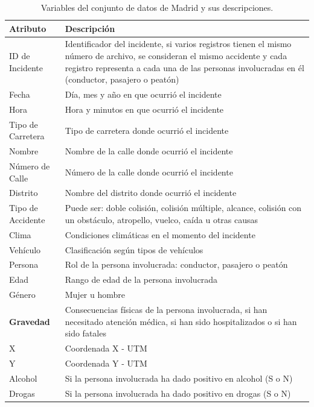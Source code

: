 \documentclass{uathesis-es}
\begin{document}
{		%
		\begin{table}[ht]
			\begin{center}
				\begin{tabular}{|p{3cm}|p{11cm}|}
					\hline
					\textbf{Atributo} & \textbf{Descripción} \\ \hline \hline
					ID de Incidente  & Identificador del incidente, si varios registros tienen el mismo número de archivo, se consideran el mismo accidente y cada registro representa a cada una de las personas involucradas en él (conductor, pasajero o peatón)  \\ \hline
					Fecha  & Día, mes y año en que ocurrió el incidente \\ \hline
					Hora  & Hora y minutos en que ocurrió el incidente \\ \hline
					Tipo de Carretera & Tipo de carretera donde ocurrió el incidente \\ \hline
					Nombre & Nombre de la calle donde ocurrió el incidente \\ \hline
					Número de Calle & Número de la calle donde ocurrió el incidente  \\ \hline
					Distrito & Nombre del distrito donde ocurrió el incidente \\ \hline
					Tipo de Accidente  & Puede ser: doble colisión, colisión múltiple, alcance, colisión con un obstáculo, atropello, vuelco, caída u otras causas \\ \hline
					Clima  & Condiciones climáticas en el momento del incidente \\ \hline
					Vehículo  & Clasificación según tipos de vehículos \\ \hline
					Persona  & Rol de la persona involucrada: conductor, pasajero o peatón \\ \hline
					Edad  & Rango de edad de la persona involucrada \\ \hline
					Género  & Mujer u hombre \\ \hline
					\textbf{Gravedad}  & Consecuencias físicas de la persona involucrada, si han necesitado atención médica, si han sido hospitalizados o si han sido fatales \\ \hline
					X   & Coordenada X - UTM \\ \hline
					Y   & Coordenada Y - UTM \\ \hline
					Alcohol & Si la persona involucrada ha dado positivo en alcohol (S o N) \\ \hline
					Drogas & Si la persona involucrada ha dado positivo en drogas (S o N) \\ \hline \hline
				\end{tabular}
			\end{center}
			\caption{Variables del conjunto de datos de Madrid y sus descripciones.}
			\label{Datadescription}
		\end{table}
		
}
\end{document}
